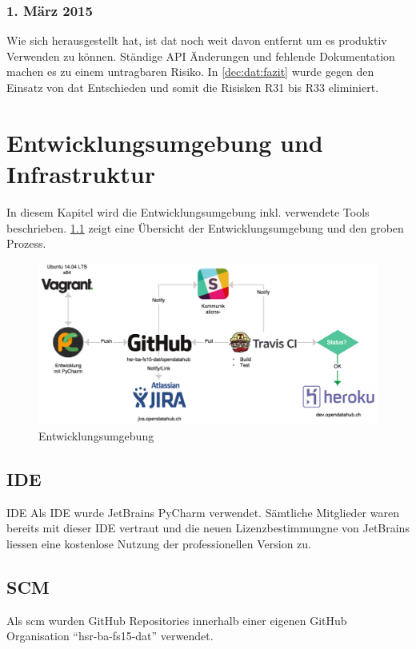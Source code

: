 \subsection{1. März 2015}

Wie sich herausgestellt hat, ist \gls{dat} noch weit davon entfernt um es produktiv Verwenden zu können. Ständige API Änderungen und fehlende Dokumentation machen es zu einem untragbaren Risiko. In \vref{dec:dat:fazit} wurde gegen den Einsatz von \gls{dat} Entschieden und somit die Risisken R31 bis R33 eliminiert.



\chapter{Entwicklungsumgebung und Infrastruktur}
In diesem Kapitel wird die Entwicklungsumgebung inkl. verwendete Tools beschrieben. \cref{fig:pm:entwicklungsumgebung} zeigt eine Übersicht der Entwicklungsumgebung und den groben Prozess.

\begin{figure}[H]
	\centering
	\includegraphics[width=\linewidth]{fig/entwicklungsumgebung}
	\caption{Entwicklungsumgebung}
	\label{fig:pm:entwicklungsumgebung}
\end{figure}

\section{IDE}
\begin{decision}{IDE}
	Als IDE wurde JetBrains PyCharm verwendet. Sämtliche Mitglieder waren bereits mit dieser IDE vertraut und die neuen Lizenzbestimmungne von JetBrains liessen eine kostenlose Nutzung der professionellen Version zu.

\end{decision}
\section{SCM}
Als \gls{scm} wurden GitHub Repositories innerhalb einer eigenen GitHub Organisation ``hsr-ba-fs15-dat'' verwendet.


